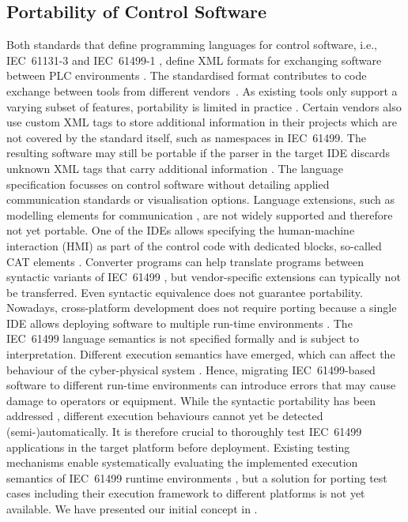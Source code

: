 \begin{bibunit}
\subsection{Portability of Control Software}
Both standards that define programming languages for control software, i.e., IEC~61131-3 \cite{61131.3} and IEC~61499-1 \cite{61499}, define XML formats for exchanging software between PLC environments \cite{61131.10,plcopenpaper, 61499.2, Testing_Midhun}. The standardised format contributes to code exchange between tools from different vendors~\cite{plcopenpaper}. As existing tools only support a varying subset of features, portability is limited in practice \cite{Testing_Midhun}. Certain vendors also use custom XML tags to store additional information in their projects which are not covered by the standard itself, such as namespaces in IEC~61499. The resulting software may still be portable if the parser in the target IDE discards unknown XML tags that carry additional information \cite{Hopsu.2019}.  The language specification focusses on control software without detailing applied communication standards or visualisation options. Language extensions, such as modelling elements for communication \cite{Bruns.2023}, are not widely supported and therefore not yet portable. One of the IDEs allows specifying the human-machine interaction (HMI) as part of the control code with dedicated blocks, so-called CAT elements \cite{Hopsu.2019}. Converter programs can help translate programs between syntactic variants of IEC~61499 \cite{Hopsu.2019}, but vendor-specific extensions can typically not be transferred. 
Even syntactic equivalence does not guarantee portability. Nowadays, cross-platform development does not require porting because a single IDE allows deploying software to multiple run-time environments \cite{aimirimi}. 
The IEC~61499 language semantics is not specified formally and is subject to interpretation. Different execution semantics have emerged, which can affect the behaviour of the cyber-physical system \cite{cengic_executionsemantics}. Hence, migrating IEC~61499-based software to different run-time environments can introduce errors that may cause damage to operators or equipment. While the syntactic portability has been addressed \cite{Hopsu.2019,Testing_Midhun}, different execution behaviours cannot yet be detected (semi-)automatically. It is therefore crucial to thoroughly test IEC~61499 applications in the target platform before deployment. Existing testing mechanisms enable systematically evaluating the implemented execution semantics of IEC~61499 runtime environments \cite{Wiesmayr.2023,pfefferkorn,Testing_Midhun}, but a solution for porting test cases including their execution framework to different platforms is not yet available. We have presented our initial concept in \cite{biancaMidhunETFAwip}. 


\end{bibunit}
